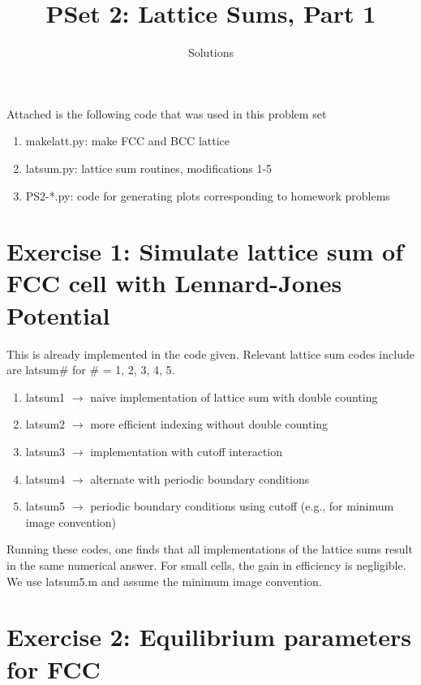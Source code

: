 \documentclass[12pt, oneside]{article}
\title{PSet 2: Lattice Sums, Part 1}
\author{Solutions}
\date{}
\begin{document}
\maketitle

Attached is the following code that was used in this problem set

\begin{enumerate}
    \item make\textunderscore latt.py: make FCC and BCC lattice
    \item lat\textunderscore sum.py: lattice sum routines, modifications 1-5
    \item PS2-*.py: code for generating plots corresponding to homework problems
\end{enumerate}

\section{Exercise 1: Simulate lattice sum of FCC cell with Lennard-Jones Potential}

This is already implemented in the code given. Relevant lattice sum codes include are lat\textunderscore sum\# for \# = 1, 2, 3, 4, 5. 

 \begin{enumerate}
   \item lat\textunderscore sum1    $\rightarrow$ naive implementation of lattice sum with double counting
   \item lat\textunderscore sum2  $\rightarrow$ more efficient indexing without double counting
   \item lat\textunderscore sum3  $\rightarrow$ implementation with cutoff interaction
   \item lat\textunderscore sum4  $\rightarrow$ alternate with periodic boundary conditions
   \item lat\textunderscore sum5  $\rightarrow$ periodic boundary conditions using cutoff (e.g., for minimum image convention)
 \end{enumerate}
 
 Running these codes, one finds that all implementations of the lattice sums result in the same numerical answer. For small cells, the gain in efficiency is negligible. We use latsum5.m and assume the minimum image convention. 

\section{Exercise 2: Equilibrium parameters for FCC}
\end{document}

